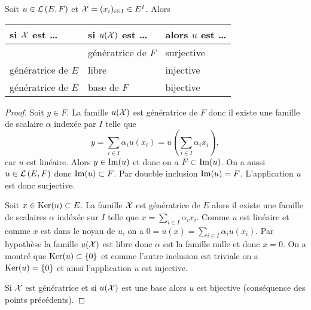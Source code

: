 \begin{prop}\label{prop:propdeduitesu}
  Soit \(u \in \mathcal{L}\left(E,F\right)\) et \(\mathcal{X}=(x_i)_{i \in I} \in E^I\). Alors
  \begin{center}
    \begin{tabular}{|l|l|l|}\hline
      si \(\mathcal{X}\) est \ldots & si \(u(\mathcal{X})\) est \ldots & alors \(u\) est \ldots \\\hline
      & génératrice de \(F\) & surjective \\
      génératrice de \(E\) & libre & injective \\
      génératrice de \(E\) & base de \(F\) & bijective \\ \hline
    \end{tabular}
  \end{center}

\end{prop}
\begin{proof}
  Soit \(y \in F\). La famille \(u(\mathcal{X})\) est génératrice de \(F\) donc il existe une famille de scalaire \(\alpha\) indexée par \(I\) telle que
  \begin{equation}
    y = \sum_{i \in I} \alpha_i u(x_i)=u \left( \sum_{i \in I} \alpha_i x_i \right),
  \end{equation}
  car \(u\) est linéaire. Alors \(y \in \operatorname{Im}(u)\) et donc on a \(F \subset \operatorname{Im}(u)\). On a aussi \(u \in \mathcal{L}\left(E,F\right)\) donc \(\operatorname{Im}(u) \subset F\). Par doucble inclusion \(\operatorname{Im}(u)=F\). L'application \(u\) est donc surjective.

  Soit \(x \in \operatorname{Ker}(u) \subset E\). La famille \(\mathcal{X}\) est génératrice de \(E\) alors il existe une famille de scalaires \(\alpha\) indéxée sur \(I\) telle que \(x = \sum_{i \in I} \alpha_i x_i\). Comme \(u\) est linéaire et comme \(x\) est dans le noyau de \(u\), on a \(0=u(x) = \sum_{i \in I} \alpha_i u(x_i)\). Par hypothèse la famille \(u(\mathcal{X})\) est libre donc \(\alpha\) est la famille nulle et donc \(x=0\). On a montré que \(\operatorname{Ker}(u) \subset \{0\}\) et comme l'autre inclusion est triviale on a \(\operatorname{Ker}(u)=\{0\}\) et ainsi l'application \(u\) est injective.

  Si \(\mathcal{X}\) est génératrice et si \(u(\mathcal{X})\) est une base alors \(u\) est bijective (conséquence des points précédents).
\end{proof}

